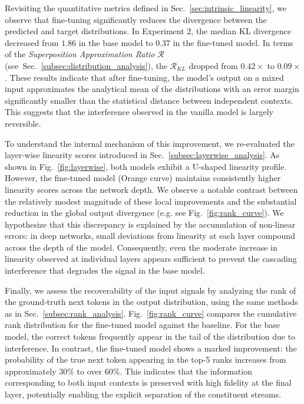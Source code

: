 \documentclass{article}
\theoremstyle{plain}
\theoremstyle{definition}
\theoremstyle{remark}
\begin{document}
Revisiting the quantitative metrics defined in Sec.~\ref{sec:intrinsic_linearity}, we observe that fine-tuning significantly reduces the divergence between the predicted and target distributions. In Experiment 2, the median KL divergence decreased from $1.86$ in the base model to $0.37$ in the fine-tuned model. In terms of the \textit{Superposition Approximation Ratio} $\mathcal{R}$ (see~Sec.~\ref{subsec:distribution_analysis}), the $\mathcal{R}_{KL}$ dropped from $0.42\times$ to $0.09\times$. These results indicate that after fine-tuning, the model's output on a mixed input approximates the analytical mean of the distributions with an error margin significantly smaller than the statistical distance between independent contexts. This suggests that the interference observed in the vanilla model is largely reversible.

To understand the internal mechanism of this improvement, we re-evaluated the layer-wise linearity scores introduced in Sec.~\ref{subsec:layerwise_analysis}. As shown in Fig.~\ref{fig:layerwise}, both models exhibit a U-shaped linearity profile. However, the fine-tuned model (Orange curve) maintains consistently higher linearity scores across the network depth. We observe a notable contrast between the relatively modest magnitude of these local improvements and the substantial reduction in the global output divergence (e.g. see Fig.~\ref{fig:rank_curve}). We hypothesize that this discrepancy is explained by the accumulation of non-linear errors: in deep networks, small deviations from linearity at each layer compound across the depth of the model. Consequently, even the moderate increase in linearity observed at individual layers appears sufficient to prevent the cascading interference that degrades the signal in the base model.

Finally, we assess the recoverability of the input signals by analyzing the rank of the ground-truth next tokens in the output distribution, using the same methods as in Sec.~\ref{subsec:rank_analysis}. Fig.~\ref{fig:rank_curve} compares the cumulative rank distribution for the fine-tuned model against the baseline. For the base model, the correct tokens frequently appear in the tail of the distribution due to interference. In contrast, the fine-tuned model shows a marked improvement: the probability of the true next token appearing in the top-5 ranks increases from approximately $30\%$ to over $60\%$. This indicates that the information corresponding to both input contexts is preserved with high fidelity at the final layer, potentially enabling the explicit separation of the constituent streams.
\end{document}
